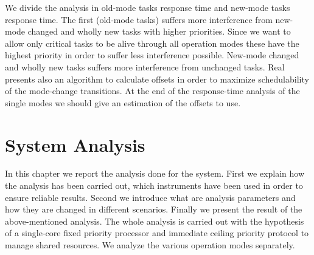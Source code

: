 \documentclass[10pt,a4paper]{report}
\begin{document}
We divide the analysis in old-mode tasks response time and new-mode tasks response 
time. The first (old-mode tasks) suffers more interference from new-mode changed
and wholly new tasks with higher priorities. Since we want to allow only 
critical tasks to be alive through all operation modes these have the highest 
priority in order to suffer less interference possible. New-mode changed and 
wholly new tasks suffers more interference from unchanged tasks. Real presents
also an algorithm to calculate offsets in order to maximize schedulability of 
the mode-change transitions. At the end of the response-time analysis of the 
single modes we should give an estimation of the offsets to use. 

\chapter{System Analysis}
In this chapter we report the analysis done for the system. First we explain how
the analysis has been carried out, which instruments have been used in order to
ensure reliable results. Second we introduce what are analysis 
parameters and how they are changed in different scenarios. Finally we present 
the result of the above-mentioned analysis. The whole analysis is carried out
with the hypothesis of a single-core fixed priority processor and immediate 
ceiling priority protocol to manage shared resources. We analyze the various 
operation modes separately. 
\end{document}
